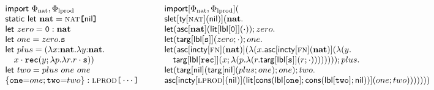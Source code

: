 \documentclass[9pt,preprint]{sigplanconf}
\newcommand{\F}[1]{{\sf #1}~}
\newcommand{\FF}[1]{{\sf #1}}
\begin{document}
\begin{figure*}[t!]
\small
$
\begin{array}{ll}
\F{import} \Phi_\text{nat}, \Phi_\text{lprod} & \FF{import}[\Phi_\text{nat}, \Phi_\text{lprod}](\\
\F{static~let} \tvar{nat} = \fvar{nat}\texttt{\textbf{[}}\FF{nil}\texttt{\textbf{]}} & \FF{slet}[\FF{ty}[\fvar{nat}](\FF{nil})](\tvar{nat}.\\
\F{let} zero = \texttt{0} : \tvar{nat} & \FF{let}(\FF{asc}[\tvar{nat}](\FF{lit}[\FF{lbl}[\texttt{0}]](\cdot)); zero.\\
\F{let} one = zero.{\texttt{s}} & \FF{let}(\FF{targ}[\abslbl{s}](zero; \cdot); one.\\
\F{let} plus = (\lambda x{:}\tvar{nat}. \lambda y{:}\tvar{nat}. &  \FF{let}(\FF{asc}[\FF{incty}[\fvar{fn}](\tvar{nat})](\lambda(x.\FF{asc}[\FF{incty}[\fvar{fn}](\tvar{nat})](\lambda(y.\\
\quad x\cdot{\texttt{rec}}(y; \lambda p.\lambda r. r\cdot{\texttt{s}})) & \quad \FF{targ}[\abslbl{rec}](x; \lambda(p.\lambda(r.\FF{targ}[\abslbl{s}](r; \cdot)))))))); plus.\\
\F{let} two = plus~one~one & \FF{let}(\FF{targ}[\FF{nil}](\FF{targ}[\FF{nil}](plus; one); one); two.\\
\{{\texttt{one}} {=} one; {\texttt{two}} {=} two\} : \fvar{lprod}\texttt{[}\cdots\texttt{]}~~~~~~& \FF{asc}[\FF{incty}[\fvar{lprod}](\FF{nil})](\FF{lit}[\FF{cons}(\abslbl{one}; \FF{cons}(\abslbl{two}; \FF{nil}))](one; two)))))))\\
\end{array}
$~~

\end{figure*}
\end{document}
